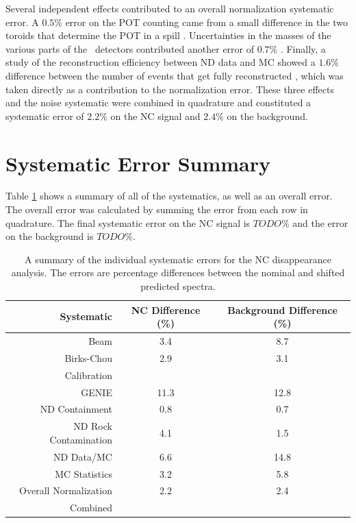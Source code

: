 Several independent effects contributed to an overall normalization systematic error. A $0.5\%$ error on the POT counting came from a small difference in the two toroids that determine the POT in a spill \cite{ref:TNBeam}. Uncertainties in the masses of the various parts of the \nova~detectors contributed another error of $0.7\%$ \cite{ref:MassError}. Finally, a study of the reconstruction efficiency between ND data and MC showed a $1.6\%$ difference between the number of events that get fully reconstructed \cite{ref:NDDataMCRecoEff}, which was taken directly as a contribution to the normalization error. These three effects and the noise systematic were combined in quadrature and constituted a systematic error of $2.2\%$ on the NC signal and $2.4\%$ on the background.

\section{Systematic Error Summary}

Table \ref{tab:SystSummary} shows a summary of all of the systematics, as well as an overall error. The overall error was calculated by summing the error from each row in quadrature. The final systematic error on the NC signal is $TODO\%$ and the error on the background is $TODO\%$.
\begin{table}[h]
  \begin{center}
    \caption[Systematic Error Summary]{A summary of the individual systematic errors for the NC disappearance analysis. The errors are percentage differences between the nominal and shifted predicted spectra.}
    \label{tab:SystSummary}
    \begin{tabular}{r c c}
      \hline\hline
      Systematic & NC Difference (\%) & Background Difference (\%) \\
      \hline
      Beam & 3.4 & 8.7 \\
      Birks-Chou & 2.9 & 3.1 \\
      Calibration & & \\
      GENIE & 11.3 & 12.8 \\
      ND Containment & 0.8 & 0.7 \\
      ND Rock Contamination & 4.1 & 1.5 \\
      ND Data/MC & 6.6 & 14.8 \\
      MC Statistics & 3.2 & 5.8 \\
      Overall Normalization & 2.2 & 2.4 \\
      \hline
      Combined & & \\
      \hline
    \end{tabular}
  \end{center}
\end{table}

